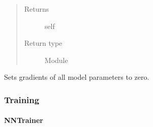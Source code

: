 \documentclass[letterpaper,10pt,english]{sphinxmanual}
\begin{document}
\begin{fulllineitems}
\begin{fulllineitems}
\begin{quote}
\begin{description}
\item[{Returns}] \leavevmode
self

\item[{Return type}] \leavevmode
Module

\end{description}\end{quote}

\end{fulllineitems}


\begin{fulllineitems}
\label{\detokenize{api/dynamics:geology.metamodelling.dynamics.LatentSpaceDynamics.zero_grad}}
Sets gradients of all model parameters to zero.

\end{fulllineitems}


\end{fulllineitems}



\subsubsection{Training}
\label{\detokenize{api/training:training}}\label{\detokenize{api/training::doc}}

\paragraph{NNTrainer}
\label{\detokenize{api/training:nntrainer}}
\end{document}
